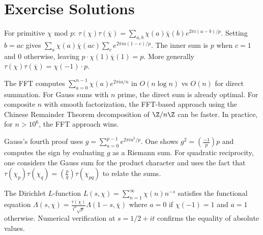 \section{Exercise Solutions}

\begin{solution}
For primitive $\chi$ mod $p$: $\tau(\chi)\tau(\overline{\chi}) = \sum_{a,b} \chi(a)\overline{\chi}(b) e^{2\pi i(a-b)/p}$. Setting $b = ac$ gives $\sum_a \chi(a)\overline{\chi}(ac) \sum_c e^{2\pi i a(1-c)/p}$. The inner sum is $p$ when $c = 1$ and $0$ otherwise, leaving $p \cdot \chi(1)\overline{\chi}(1) = p$. More generally $\tau(\chi)\tau(\overline{\chi}) = \chi(-1) \cdot p$.
\end{solution}

\begin{solution}
The FFT computes $\sum_{a=0}^{n-1} \chi(a) e^{2\pi i a/n}$ in $O(n \log n)$ vs $O(n)$ for direct summation. For Gauss sums with $n$ prime, the direct sum is already optimal. For composite $n$ with smooth factorization, the FFT-based approach using the Chinese Remainder Theorem decomposition of $\Z/n\Z$ can be faster. In practice, for $n > 10^6$, the FFT approach wins.
\end{solution}

\begin{solution}
Gauss's fourth proof uses $g = \sum_{a=0}^{p-1} e^{2\pi i a^2/p}$. One shows $g^2 = \left(\frac{-1}{p}\right) p$ and computes the sign by evaluating $g$ as a Riemann sum. For quadratic reciprocity, one considers the Gauss sum for the product character and uses the fact that $\tau(\chi_p)\tau(\chi_q) = \left(\frac{p}{q}\right)\tau(\chi_{pq})$ to relate the sums.
\end{solution}

\begin{solution}
The Dirichlet $L$-function $L(s, \chi) = \sum_{n=1}^{\infty} \chi(n) n^{-s}$ satisfies the functional equation $\Lambda(s, \chi) = \frac{\tau(\chi)}{i^a \sqrt{p}} \Lambda(1-s, \overline{\chi})$ where $a = 0$ if $\chi(-1) = 1$ and $a = 1$ otherwise. Numerical verification at $s = 1/2 + it$ confirms the equality of absolute values.
\end{solution}

